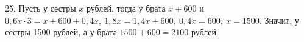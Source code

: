 25. Пусть у сестры $x$ рублей, тогда у брата $x+600$ и $0,6x\cdot3=x+600+0,4x,\ 1,8x=1,4x+600,\ 0,4x=600,\ x=1500.$ Значит, у сестры 1500 рублей, а у брата $1500+600=2100$ рублей.\\
